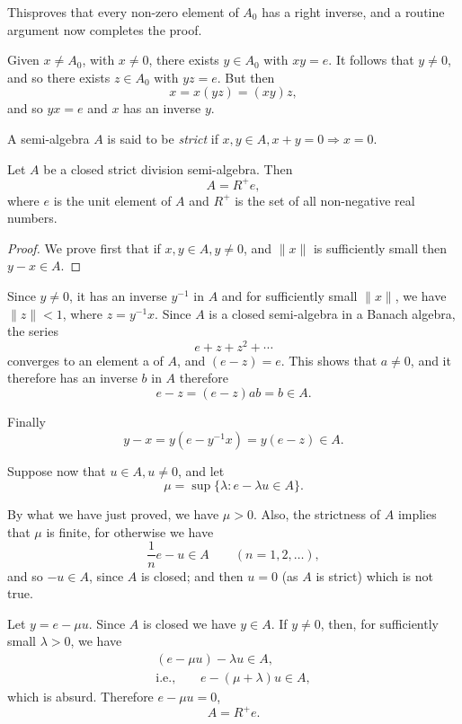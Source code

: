 This\pageoriginale proves that every non-zero element of $A_0$ has a
right inverse, and a routine argument now completes the proof.  

Given $x \neq A_0$, with $x \neq 0$, there exists $y \in A_0$ with
$xy=e$. It follows that $y \neq 0$, and so there exists $z \in A_0$
with $yz=e$. But then 
$$
x = x(yz) = (xy)z,
$$
and so $yx = e$ and $x$ has an inverse $y$.

\begin{Definition}%
  A semi-algebra $A$ is said to be {\em strict} if $x,y \in A, x + y =
  0 \Rightarrow x = 0$. 
\end{Definition}

\begin{thmm}\label{chap8:thm8.4} %
  Let $A$ be a closed strict division semi-algebra. Then
  $$
  A=R^+e,
  $$
  where $e$ is the unit element of $A$ and $R^+$ is the set of all
  non-negative real numbers. 
\end{thmm}

\begin{proof}
  We prove first that if $x,y \in A,y \neq 0$, and $\parallel x
  \parallel$ is sufficiently small then $y - x \in A$. 
\end{proof}

Since $y \neq 0$, it has an inverse $y^{-1}$ in $A$ and for
sufficiently small $\parallel x \parallel$, we have $\parallel z
\parallel < 1$, where $z = y^{-1}x$. Since $A$ is a closed
semi-algebra in a Banach algebra, the series 
$$
e + z + z^2 + \cdots 
$$
converges to an element a of $A$, and $(e-z)=e$. This shows that $a
\neq 0$, and it therefore has an inverse $b$ in $A$ therefore 
$$
e-z=(e-z)ab=b \in A.
$$\pageoriginale

Finally
$$
y - x = y(e-y^{-1}x ) = y(e-z)\in A.
$$

Suppose now that $u \in A,u \neq 0$, and let
$$
\mu= \sup \{ \lambda : e - \lambda u \in A \}.
$$

By what we have just proved, we have $\mu >0$. Also, the strictness of
$A$ implies that $\mu$ is finite, for otherwise we have 
$$
\frac{1}{n}e-u \in A \qquad (n=1,2, \ldots),
$$
and so $-u \in A$, since $A$ is closed; and then $u=0$ (as $A$ is
strict) which is not true. 

Let $y=e-\mu u$. Since $A$ is closed we have $y \in A$. If $y \neq 0$,
then, for sufficiently small $\lambda > 0$, we have 
\begin{gather*}
  (e-\mu u)- \lambda u \in A,\\
  \text{i.e.,} \qquad e-(\mu + \lambda) u \in A,
\end{gather*}
which is absurd. Therefore $e- \mu u=0$,
$$
A = R^+e.
$$

